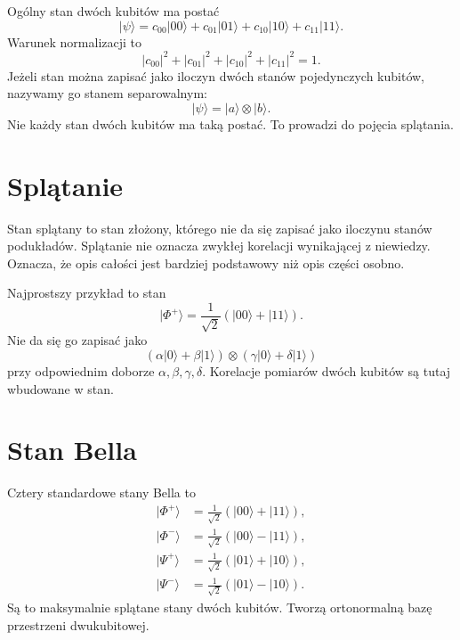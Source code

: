 Ogólny stan dwóch kubitów ma postać
\begin{equation}
    |\psi\rangle
    =c_{00}|00\rangle+c_{01}|01\rangle+c_{10}|10\rangle+c_{11}|11\rangle.
\end{equation}
Warunek normalizacji to
\begin{equation}
    |c_{00}|^2+|c_{01}|^2+|c_{10}|^2+|c_{11}|^2=1.
\end{equation}
Jeżeli stan można zapisać jako iloczyn dwóch stanów pojedynczych kubitów, nazywamy go stanem separowalnym:
\begin{equation}
    |\psi\rangle=|a\rangle\otimes|b\rangle.
\end{equation}
Nie każdy stan dwóch kubitów ma taką postać. To prowadzi do pojęcia splątania.

\section{Splątanie}

Stan splątany to stan złożony, którego nie da się zapisać jako iloczynu stanów podukładów. Splątanie nie oznacza zwykłej korelacji wynikającej z niewiedzy. Oznacza, że opis całości jest bardziej podstawowy niż opis części osobno.

Najprostszy przykład to stan
\begin{equation}
    |\Phi^+\rangle=\frac{1}{\sqrt{2}}\left(|00\rangle+|11\rangle\right).
\end{equation}
Nie da się go zapisać jako
\begin{equation}
    (\alpha|0\rangle+\beta|1\rangle)\otimes(\gamma|0\rangle+\delta|1\rangle)
\end{equation}
przy odpowiednim doborze \(\alpha,\beta,\gamma,\delta\). Korelacje pomiarów dwóch kubitów są tutaj wbudowane w stan.

\section{Stan Bella}

Cztery standardowe stany Bella to
\begin{align}
    |\Phi^+\rangle &=\frac{1}{\sqrt{2}}(|00\rangle+|11\rangle),\\
    |\Phi^-\rangle &=\frac{1}{\sqrt{2}}(|00\rangle-|11\rangle),\\
    |\Psi^+\rangle &=\frac{1}{\sqrt{2}}(|01\rangle+|10\rangle),\\
    |\Psi^-\rangle &=\frac{1}{\sqrt{2}}(|01\rangle-|10\rangle).
\end{align}
Są to maksymalnie splątane stany dwóch kubitów. Tworzą ortonormalną bazę przestrzeni dwukubitowej.

